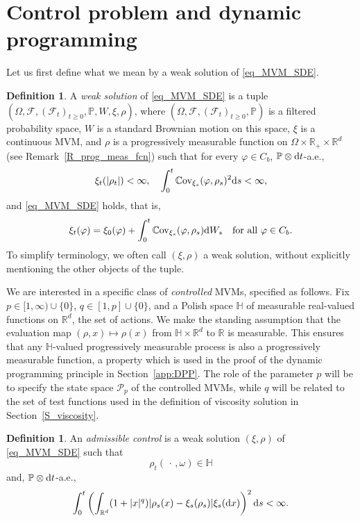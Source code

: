 \documentclass{article}
\theoremstyle{definition}
\newtheorem{definition}[theorem]{Definition}
\numberwithin{equation}{section}
\numberwithin{theorem}{section}
\renewcommand{\P}{\mathbb{P}}
\newcommand{\R}{\mathbb{R}}
\newcommand{\Hb}{\mathbb{H}}
\newcommand{\Pc}{\mathcal{P}}
\newcommand{\Cov}{\mathbb{C}\mathrm{ov}}
\renewcommand{\d}{{\rm d}}
\renewcommand{\P}{{\mathbb P}}
\newcommand{\Fcal}{{\mathcal F}}
\newcommand{\Pcal}{{\mathcal P}}
\newcommand{\fdot}{{\,\cdot\,}}
\begin{document}
\section{Control problem and dynamic programming}
\label{sec:contr-probl-dynam}

Let us first define what we mean by a weak solution of \eqref{eq_MVM_SDE}.

\begin{definition}\label{def:sol_of_SDE}
A \emph{weak solution} of \eqref{eq_MVM_SDE} is a tuple $(\Omega,\Fcal,(\Fcal_t)_{t\ge0},\P,W,\xi,\rho)$, where $(\Omega,\Fcal,(\Fcal_t)_{t\ge0},\P)$ is a filtered probability space, $W$ is a standard Brownian motion on this space, $\xi$ is a continuous MVM, and $\rho$ is a progressively measurable function on $\Omega\times\R_+\times {\R^d}$ (see Remark~\ref{R_prog_meas_fcn}) such that for every $\varphi\in C_b$, $\P\otimes \d t$-a.e.,
\[
\xi_t(|\rho_t|)<\infty, \quad \int_0^t \Cov_{\xi_s}(\varphi,\rho_s)^2\d s<\infty,
\]
and \eqref{eq_MVM_SDE} holds, that is,
\[
\xi_t(\varphi) = \xi_0(\varphi) + \int_0^t \Cov_{\xi_s}(\varphi,\rho_s) \d W_s \quad \text{for all } \varphi \in C_b.
\]
To simplify terminology, we often call $(\xi,\rho)$ a weak solution, without explicitly mentioning the other objects of the tuple.
\end{definition}

We are interested in a specific class of \emph{controlled} MVMs, specified as follows. Fix $p \in [1,\infty) \cup \{0\}$, $q \in [1,p] \cup \{0\}$, and a Polish space $\Hb$ of measurable real-valued functions on $\R^d$, the set of actions. We make the standing assumption that the evaluation map $(\rho,x) \mapsto \rho(x)$ from $\mathbb H \times \R^d$ to $\R$ is measurable. This ensures that any $\Hb$-valued progressively measurable process is also a progressively measurable function, a property which is used in the proof of the dynamic programming principle in Section~\ref{app:DPP}.
The role of the parameter $p$ will be to specify the state space $\Pcal_p$ of the controlled MVMs, while $q$ will be related to the set of test functions used in the definition of viscosity solution in Section~\ref{S_viscosity}.


\begin{definition}\label{def:adm_control}
An \emph{admissible control} is a weak solution $(\xi,\rho)$ of \eqref{eq_MVM_SDE} such that
\[
\rho_t(\fdot,\omega)\in\Hb
\]
and, $\P\otimes \d t$-a.e., 
\begin{equation}\label{eqn3}
\int_0^t \left( \int_{\R^d} (1 + |x|^q) |\rho_s(x) - \xi_s(\rho_s)| \xi_s(\d x) \right)^2 \d s < \infty.
\end{equation}
\end{definition}
\end{document}
